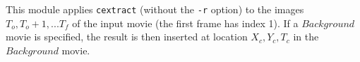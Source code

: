 This module applies \verb+cextract+ (without the \verb+-r+ option)
to the images $T_o, T_o+1, ... T_f$ of the input movie (the first frame
has index 1).
If a $Background$ movie is specified, the result is then inserted
at location $X_c,Y_c,T_c$ in the $Background$ movie.

